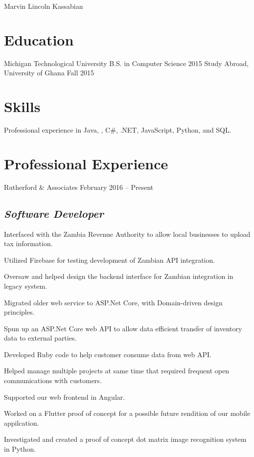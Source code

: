 \documentclass{marvinkassabian_resume}
\begin{document}
	\resumeheadersimple
			{Marvin Lincoln Kassabian}
	\section{Education}
		\subsectionlocationdate
				{Michigan Technological University}
				{B.S. in Computer Science}
				{2015}
		\subsectiondate
				{Study Abroad, University of Ghana}
				{Fall 2015}
	\section{Skills}
		\resumesublistbegin
			\item Professional experience in Java, \cpp, C\#, .NET, JavaScript, Python, and SQL.
		\resumesublistend
	\section{Professional Experience}
		\subsectiondate
				{Rutherford \& Associates}
				{February 2016 – Present}
			\resumesublistbegin
				\item[] \subsection
						{\textbf{\textit{Software Developer}}}
					\resumesublistbegin
						\item Interfaced with the Zambia Revenue Authority to allow local businesses to upload tax information.
						\item Utilized Firebase for testing development of Zambian API integration.
						\item Oversaw and helped design the backend interface for Zambian integration in legacy system.
						\item Migrated older web service to ASP.Net Core, with Domain-driven design principles.
						\item Spun up an ASP.Net Core web API to allow data efficient transfer of inventory data to external parties.
						\item Developed Ruby code to help customer consume data from web API.
						\item Helped manage multiple projects at same time that required frequent open communications with customers.
						\item Supported our web frontend in Angular.
						\item Worked on a Flutter proof of concept for a possible future rendition of our mobile appilcation.
						\item Investigated and created a proof of concept dot matrix image recognition system in Python.
\end{document}
